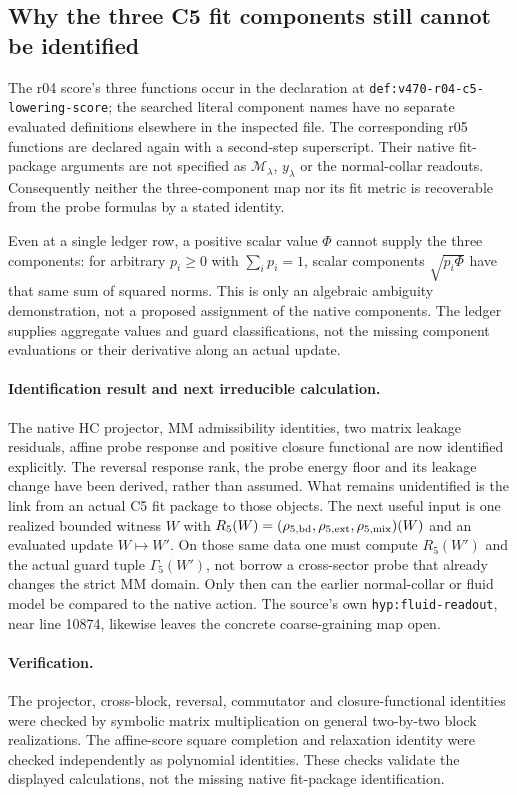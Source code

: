 \documentclass[11pt,a4paper]{article}
\begin{document}
\subsection{Why the three C5 fit components still cannot be identified}
The r04 score's three functions occur in the declaration at
\texttt{def:v470-r04-c5-lowering-score}; the searched literal component
names have no separate evaluated definitions elsewhere in the inspected
file. The corresponding r05 functions are declared again with a
second-step superscript. Their native fit-package arguments are not
specified as $\mathcal M_\lambda$, $y_\lambda$ or the normal-collar readouts.
Consequently neither the three-component map nor its fit metric is
recoverable from the probe formulas by a stated identity.

Even at a single ledger row, a positive scalar value $\Phi$ cannot supply
the three components: for arbitrary $p_i\ge0$ with $\sum_i p_i=1$, scalar
components $\sqrt{p_i\Phi}$ have that same sum of squared norms. This is
only an algebraic ambiguity demonstration, not a proposed assignment of
the native components. The ledger supplies aggregate values and guard
classifications, not the missing component evaluations or their derivative
along an actual update.

\paragraph{Identification result and next irreducible calculation.}
The native HC projector, MM admissibility identities, two matrix leakage
residuals, affine probe response and positive closure functional are now
identified explicitly. The reversal response rank, the probe energy floor
and its leakage change have been derived, rather than assumed. What remains
unidentified is the link from an actual C5 fit package to those objects.
The next useful input is one realized bounded witness $W$ with
$R_5(W)=(\rho_{5,\rm bd},\rho_{5,\rm ext},\rho_{5,\rm mix})(W)$ and
an evaluated update $W\mapsto W'$. On those same data one must compute
$R_5(W')$ and the actual guard tuple $\Gamma_5(W')$, not borrow a
cross-sector probe that already changes the strict MM domain.
Only then can the earlier normal-collar or fluid model be compared to
the native action. The source's own \texttt{hyp:fluid-readout}, near
line 10874, likewise leaves the concrete coarse-graining map open.

\paragraph{Verification.}
The projector, cross-block, reversal, commutator and closure-functional
identities were checked by symbolic matrix multiplication on general
two-by-two block realizations. The affine-score square completion and
relaxation identity were checked independently as polynomial identities.
These checks validate the displayed calculations, not the missing native
fit-package identification.
\end{document}
